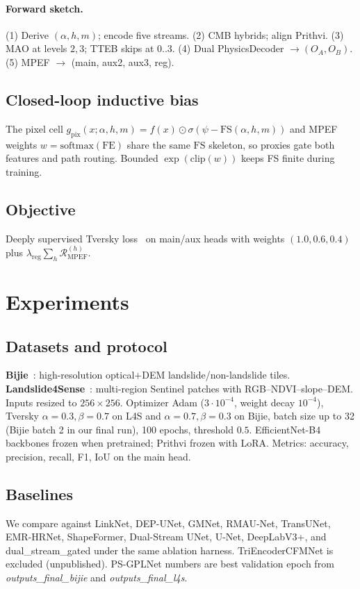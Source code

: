 \paragraph{Forward sketch.}
(1) Derive $(\alpha,h,m)$; encode five streams.
(2) CMB hybrids; align Prithvi.
(3) MAO at levels $2,3$; TTEB skips at $0..3$.
(4) Dual PhysicsDecoder $\rightarrow (O_A,O_B)$.
(5) MPEF $\rightarrow$ (main, aux2, aux3, reg).

\subsection{Closed-loop inductive bias}
The pixel cell $g_{\mathrm{pix}}(x;\alpha,h,m)=f(x)\odot\sigma(\psi-\mathrm{FS}(\alpha,h,m))$ and MPEF weights $w=\mathrm{softmax}(\mathrm{FE})$ share the same $\mathrm{FS}$ skeleton, so proxies gate both features and path routing. Bounded $\exp(\mathrm{clip}(w))$ keeps FS finite during training.

\subsection{Objective}
Deeply supervised Tversky loss~\cite{salehi2017tversky} on main/aux heads with weights $(1.0,0.6,0.4)$ plus $\lambda_{\mathrm{reg}}\sum_h\mathcal{R}_{\mathrm{MPEF}}^{(h)}$.

\section{Experiments}
\subsection{Datasets and protocol}
\textbf{Bijie}~\cite{ji2020bijie}: high-resolution optical$+$DEM landslide/non-landslide tiles. \textbf{Landslide4Sense}~\cite{ghorbanzadeh2022landslide4sense}: multi-region Sentinel patches with RGB--NDVI--slope--DEM. Inputs resized to $256\times256$. Optimizer Adam ($3\cdot10^{-4}$, weight decay $10^{-4}$), Tversky $\alpha{=}0.3,\beta{=}0.7$ on L4S and $\alpha{=}0.7,\beta{=}0.3$ on Bijie, batch size up to 32 (Bijie batch 2 in our final run), 100 epochs, threshold $0.5$. EfficientNet-B4 backbones frozen when pretrained; Prithvi frozen with LoRA. Metrics: accuracy, precision, recall, F1, IoU on the main head.

\subsection{Baselines}
We compare against LinkNet, DEP-UNet, GMNet, RMAU-Net, TransUNet, EMR-HRNet, ShapeFormer, Dual-Stream UNet, U-Net, DeepLabV3+, and dual\_stream\_gated under the same ablation harness. TriEncoderCFMNet is excluded (unpublished). PS-GPLNet numbers are best validation epoch from \textit{outputs\_final\_bijie} and \textit{outputs\_final\_l4s}.

